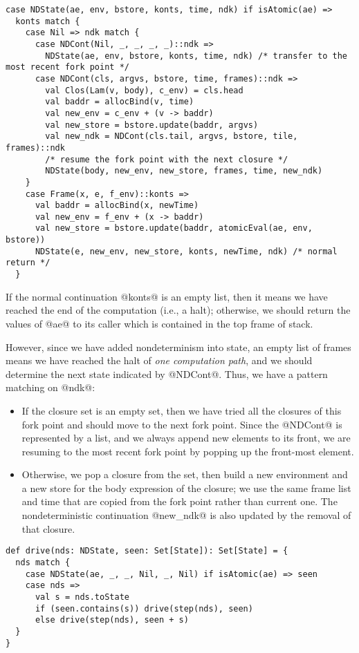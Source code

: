 \documentclass[acmsmall]{acmart}\settopmatter{}
\begin{document}
\begin{lstlisting}
case NDState(ae, env, bstore, konts, time, ndk) if isAtomic(ae) =>
  konts match {
    case Nil => ndk match {
      case NDCont(Nil, _, _, _, _)::ndk =>
        NDState(ae, env, bstore, konts, time, ndk) /* transfer to the most recent fork point */
      case NDCont(cls, argvs, bstore, time, frames)::ndk =>
        val Clos(Lam(v, body), c_env) = cls.head
        val baddr = allocBind(v, time)
        val new_env = c_env + (v -> baddr)
        val new_store = bstore.update(baddr, argvs)
        val new_ndk = NDCont(cls.tail, argvs, bstore, tile, frames)::ndk
        /* resume the fork point with the next closure */
        NDState(body, new_env, new_store, frames, time, new_ndk)
    }
    case Frame(x, e, f_env)::konts =>
      val baddr = allocBind(x, newTime)
      val new_env = f_env + (x -> baddr)
      val new_store = bstore.update(baddr, atomicEval(ae, env, bstore))
      NDState(e, new_env, new_store, konts, newTime, ndk) /* normal return */
  }
\end{lstlisting}

If the normal continuation @konts@ is an empty list, then it means we have reached
the end of the computation (i.e., a halt); otherwise, we should return the values of 
@ae@ to its caller which is contained in the top frame of stack.

However, since we have added nondeterminism into state, an empty list of frames means
we have reached the halt of \textit{one computation path}, and we should
determine the next state indicated by @NDCont@.
Thus, we have a pattern matching on @ndk@:
\begin{itemize}
  \item If the closure set is an empty set,
then we have tried all the closures of this fork point and should move to the
next fork point. Since the @NDCont@ is represented by a list, and we always
append new elements to its front, we are resuming to the most recent fork point by
popping up the front-most element.
  \item Otherwise, we pop a closure from the set, then build a new
environment and a new store for the body expression of the closure;
we use the same frame list and time that are copied from the fork point rather
than current one.
The nondeterministic continuation @new_ndk@ is also updated by the removal of that closure.
\end{itemize}

\begin{lstlisting}
def drive(nds: NDState, seen: Set[State]): Set[State] = {
  nds match {
    case NDState(ae, _, _, Nil, _, Nil) if isAtomic(ae) => seen
    case nds =>
      val s = nds.toState
      if (seen.contains(s)) drive(step(nds), seen)
      else drive(step(nds), seen + s)
  }
}
\end{lstlisting}
\end{document}
